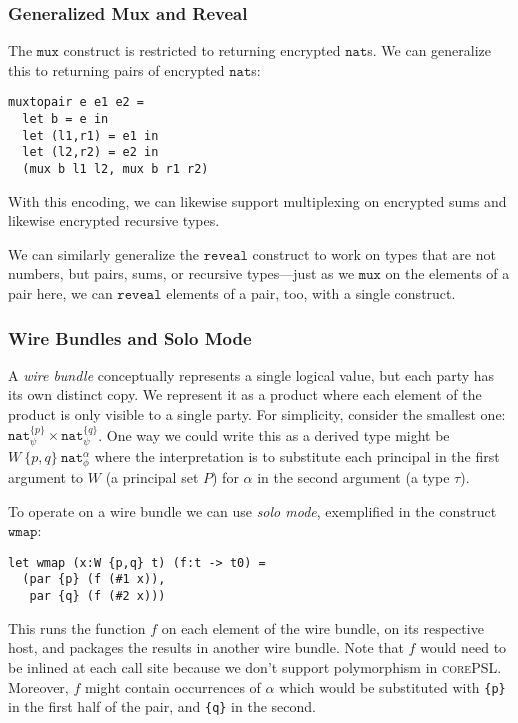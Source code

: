 \documentclass[10pt]{article}
\newcommand{\kw}[1]{\ensuremath{\mathtt{#1}}}
\newcommand{\tnat}{\ensuremath{\mathtt{nat}}}
\newcommand{\tpair}[2]{\ensuremath{{#1} \times {#2}}}
\newcommand{\lang}{\textsc{corePSL}\xspace}
\begin{document}
\subsubsection{Generalized Mux and Reveal}
\label{sec:generalmux}

 The $\kw{mux}$ construct is restricted to returning encrypted
$\tnat$s. We can generalize this to returning pairs of encrypted
$\tnat$s:
\begin{verbatim}
muxtopair e e1 e2 =
  let b = e in
  let (l1,r1) = e1 in
  let (l2,r2) = e2 in
  (mux b l1 l2, mux b r1 r2)
\end{verbatim}
With this encoding, we can likewise support multiplexing on encrypted
sums and likewise encrypted recursive types.

We can similarly generalize the $\kw{reveal}$ construct to work on types
that are not numbers, but pairs, sums, or recursive types---just as we
\kw{mux} on the elements of a pair here, we can \kw{reveal} elements
of a pair, too, with a single construct.

\subsubsection{Wire Bundles and Solo Mode}

A \emph{wire bundle} conceptually represents a single logical value,
but each party has its own distinct copy. We represent it as a product
where each element of the product is only visible to a single
party. For simplicity, consider the smallest one:
$\tpair{\tnat^{\{p\}}_\psi}{\tnat^{\{q\}}_\psi}$. One way we could
write this as a derived type might be $W~\{p,q\}~\tnat^\alpha_\phi$
where the interpretation is to substitute each principal in the first
argument to $W$ (a principal set $P$) for $\alpha$ in the second
argument (a type $\tau$).

To operate on a wire bundle we can use \emph{solo mode}, exemplified
in the construct $\kw{wmap}$:
\begin{verbatim}
let wmap (x:W {p,q} t) (f:t -> t0) =
  (par {p} (f (#1 x)), 
   par {q} (f (#2 x)))
\end{verbatim}
This runs the function $f$ on each element of the wire bundle, on its
respective host, and packages the results in another wire bundle. Note
that $f$ would need to be inlined at each call site because we don't
support polymorphism in \lang. Moreover, $f$ might contain
occurrences of $\alpha$ which would  be substituted with
\texttt{\{p\}} in the first half of the pair, and \texttt{\{q\}} in
the second.
\end{document}

